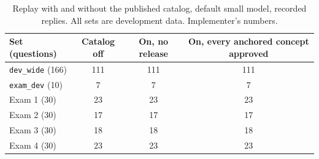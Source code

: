 \begin{table}[H]
\centering\small
\caption{Replay with and without the published catalog, default small model, recorded replies. All sets are development data. Implementer's numbers.}
\label{tab:catalog-replay}
\begin{tabular}{lccc}
\toprule
Set (questions) & Catalog off & On, no release & On, every anchored concept approved\\\midrule
\texttt{dev\_wide} (166) & 111 & 111 & 111\\
\texttt{exam\_dev} (10) & 7 & 7 & 7\\
Exam 1 (30) & 23 & 23 & 23\\
Exam 2 (30) & 17 & 17 & 17\\
Exam 3 (30) & 18 & 18 & 18\\
Exam 4 (30) & 23 & 23 & 23\\
\bottomrule
\end{tabular}
\end{table}
